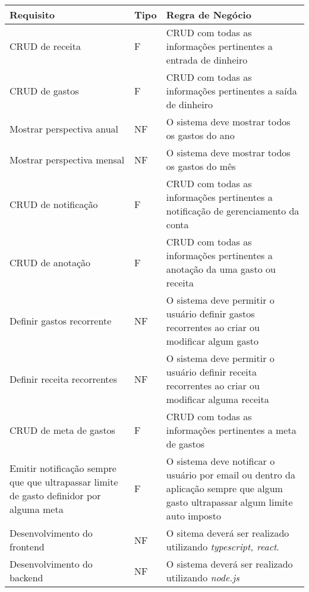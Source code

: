 \begin{longtable}[h!]{ | p{4.5cm} | l | p{8cm} | } \hline

    \textbf{Requisito} & \textbf{Tipo} & \textbf{Regra de Negócio} \\[2ex] \hline

    CRUD de receita & F & CRUD com todas as informações pertinentes a entrada de dinheiro \\ \hline

    CRUD de gastos & F & CRUD com todas as informações pertinentes a saída de dinheiro \\ \hline

    Mostrar perspectiva anual & NF & O sistema deve mostrar todos os gastos do ano \\ \hline

    Mostrar perspectiva mensal & NF & O sistema deve mostrar todos os gastos do mês \\ \hline

    CRUD de notificação & F & CRUD com todas as informações pertinentes a notificação de gerenciamento da conta \\ \hline

    CRUD de anotação & F & CRUD com todas as informações pertinentes a anotação da uma gasto ou receita \\ \hline

    Definir gastos recorrente  & NF & O sistema deve permitir o usuário definir gastos recorrentes ao criar ou modificar algum gasto \\ \hline

    Definir receita recorrentes  & NF & O sistema deve permitir o usuário definir receita recorrentes ao criar ou modificar alguma receita \\ \hline

    CRUD de meta de gastos  & F & CRUD com todas as informações pertinentes a meta de gastos \\ \hline

    Emitir notificação sempre que que ultrapassar limite de gasto definidor por alguma meta  & F & O sistema deve notificar o usuário por email ou dentro da aplicação sempre que algum gasto ultrapassar algum limite auto imposto \\ \hline

    Desenvolvimento do frontend  & NF & O sitema deverá ser realizado utilizando \textit{typescript, react}. \\ \hline

    Desenvolvimento do backend  & NF & O sistema deverá ser realizado utilizando \textit{node.js} \\ \hline


\end{longtable}
